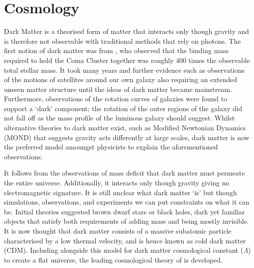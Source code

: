 \section{\LCDM Cosmology}
\label{sec:introLCDM}
Dark Matter is a theorised form of matter that interacts only though gravity and is therefore not observable with traditional methods that rely on photons. The first notion of dark matter was from \citet{Zwicky1933DieNebeln}, who observed that the binding mass required to hold the Coma Cluster together was roughly 400 times the observable total stellar mass. It took many years and further evidence such as observations of the motions of satellites around our own galaxy also requiring an extended unseen matter structure until the ideas of dark matter became mainstream. Furthermore, observations of the rotation curves of galaxies \citep{Roberts1973ComparisonTypes} were found to support a `dark' component; the rotation of the outer regions of the galaxy did not fall off as the mass profile of the luminous galaxy should suggest. Whilst alternative theories to dark matter exist, such as Modified Newtonian Dynamics (MOND) that suggests gravity acts differently at large scales, dark matter is now the preferred model amoungst physicists to explain the aforementioned observations. 

It follows from the observations of mass deficit that dark matter must permeate the entire universe. Additionally, it interacts only though gravity giving no electromagnetic signature. It is still unclear what dark matter `is' but though simulations, observations, and experiments we can put constraints on what it can be. Initial theories suggested brown dwarf stars or black holes, dark yet familiar objects that satisfy both requirements of adding mass and being mostly invisible. It is now thought that dark matter consists of a massive subatomic particle characterised by a low thermal velocity, and is hence known as cold dark matter (CDM). Including alongside this model for dark matter cosmological constant ($\Lambda$) to create a flat universe, the leading cosmological theory of \LCDM is developed. 

